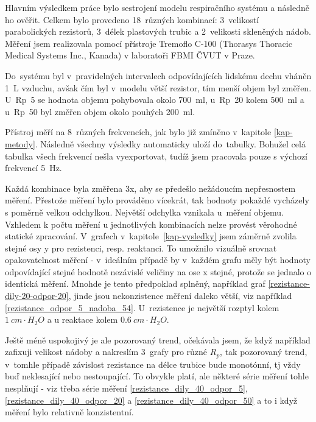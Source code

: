
Hlavním výsledkem práce bylo sestrojení modelu respiračního systému a následně ho ověřit. Celkem bylo provedeno 18~různých kombinací: 3~velikostí parabolických rezistorů, 3~délek plastových trubic a 2~velikosti skleněných nádob. Měření jsem realizovala pomocí přístroje Tremoflo C-100 (Thorasys Thoracic Medical Systems Inc., Kanada) v laboratoři FBMI ČVUT v Praze. 


Do~systému byl v~pravidelných intervalech odpovídajících lidskému dechu vháněn \SI{1}{L} vzduchu, avšak čím byl v~modelu větší rezistor, tím menší objem byl změřen. U~Rp~5 se hodnota objemu pohybovala okolo  \SI{700}{ml}, u~Rp~20 kolem  \SI{500}{ml} a u~Rp~50 byl změřen objem okolo pouhých \SI{200}{ml}.

Přístroj měří na 8~různých frekvencích, jak bylo již zmíněno v~kapitole \ref{kap-metody}. Následně všechny výsledky automaticky uloží do~tabulky. 
Bohužel celá tabulka všech frekvencí nešla vyexportovat, tudíž jsem pracovala pouze s výchozí frekvencí  \SI{5}{Hz}. 

Každá kombinace byla změřena 3x, aby se předešlo nežádoucím nepřesnostem měření. Přestože měření bylo prováděno vícekrát, tak hodnoty pokaždé vycházely s poměrně velkou odchylkou. Největší odchylka vznikala u~měření objemu.  Vzhledem k počtu měření u jednotlivých kombinacích nelze provést věrohodné statické zpracování.
V~grafech v~kapitole~\ref{kap-vysledky} jsem záměrně zvolila stejné osy y pro rezistenci, resp. reaktanci. To umožnilo vizuálně srovnat opakovatelnost měření -  v~ideálním případě by v~každém grafu měly být hodnoty odpovídající stejné hodnotě nezávislé veličiny na ose x stejné, protože se jednalo o identická měření. Mnohde je tento předpoklad splněný, například graf \ref{rezistance-dily-20-odpor-20}, jinde jsou nekonzistence měření daleko větší, viz například \ref{rezistance_odpor_5_nadoba_54}.
U~rezistence je největší rozptyl kolem $\SI{1}{ cm\cdot H_{2}O}$ a u reaktace kolem $\SI{0,6}{ cm\cdot H_{2}O}$. 


Ještě méně uspokojivý je ale pozorovaný trend, očekávala jsem, že když například zafixuji velikost nádoby a nakreslím 3~grafy pro různé $R_p$, tak pozorovaný trend, v~tomhle případě závislost rezistance na délce trubice bude monotónní, tj vždy buď neklesající nebo nestoupající. To obvykle platí, ale některé série měření tohle nesplňují - viz třeba série měření
\ref{rezistance_dily_40_odpor_5}, \ref{rezistance_dily_40_odpor_20} a \ref{rezistance_dily_40_odpor_50} a to i když měření bylo relativně konzistentní.


